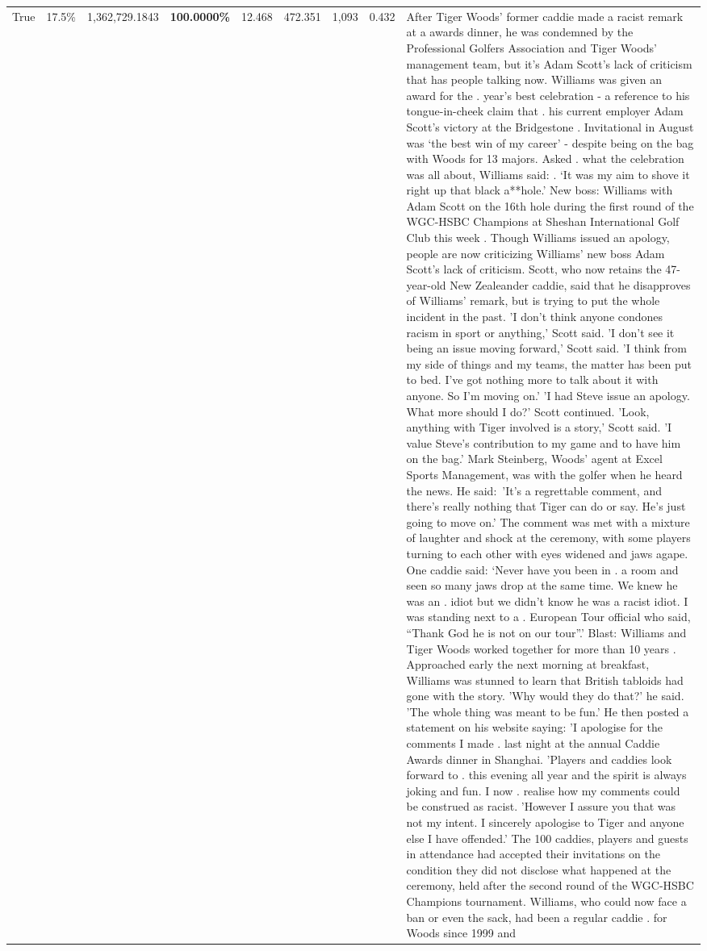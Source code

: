 \begin{table}[H]
\begin{tabular}{lllrlllll}
True & 17.5\% & 1,362,729.1843 & \bfseries \color{red} 100.0000\% & 12.468 & 472.351 & 1,093 & 0.432 & After Tiger Woods' former caddie made a racist remark at a awards dinner, he was condemned by the Professional Golfers Association and Tiger Woods' management team, but it's Adam Scott's lack of criticism that has people talking now. Williams was given an award for the . year’s best celebration - a reference to his tongue-in-cheek claim that . his current employer Adam Scott’s victory at the Bridgestone . Invitational in August was ‘the best win of my career’ - despite being on the bag with Woods for 13 majors. Asked . what the celebration was all about, Williams said: . ‘It was my aim to shove it right up that black a**hole.’ New boss: Williams with Adam Scott  on the 16th hole during the first round of the WGC-HSBC Champions at Sheshan International Golf Club this week . Though Williams issued an apology, people are now criticizing Williams' new boss Adam Scott's lack of criticism. Scott, who now retains the 47-year-old New Zealeander caddie, said that he disapproves of Williams' remark, but is trying to put the whole incident in the past. 'I don't think anyone condones racism in sport or anything,' Scott said. 'I don't see it being an issue moving forward,' Scott said. 'I think from my side of things and my teams, the matter has been put to bed. I've got nothing more to talk about it with anyone. So I'm moving on.' 'I had Steve issue an apology. What more should I do?' Scott continued. 'Look, anything with Tiger involved is a story,' Scott said. 'I value Steve's contribution to my game and to have him on the bag.' Mark Steinberg, Woods' agent at Excel Sports Management, was with the golfer when he heard the news. He said: 'It's a regrettable comment, and there's really nothing that Tiger can do or say. He's just going to move on.' The comment was met with a mixture of laughter and shock at the ceremony, with some players turning to each other with eyes widened and jaws agape. One caddie said: ‘Never have you been in . a room and seen so many jaws drop at the same time. We knew he was an . idiot but we didn’t know he was a racist idiot. I was standing next to a . European Tour official who said, “Thank God he is not on our tour”.’ Blast: Williams and Tiger Woods worked together for more than 10 years . Approached early the next morning at breakfast, Williams was stunned to learn that British tabloids had gone with the story. 'Why would they do that?' he said. 'The whole thing was meant to be fun.' He then posted a statement on his website saying: 'I apologise for the comments I made . last night at the annual Caddie Awards dinner in Shanghai. 'Players and caddies look forward to . this evening all year and the spirit is always joking and fun. I now . realise how my comments could be construed as racist. 'However I assure you that was not my intent. I sincerely apologise to Tiger and anyone else I have offended.' The 100 caddies, players and guests in attendance had accepted their invitations on the condition they did not disclose what happened at the ceremony, held after the second round of the WGC-HSBC Champions tournament. Williams, who could now face a ban or even the sack, had been a regular caddie . for Woods since 1999 and 
\end{tabular}
\end{table}
